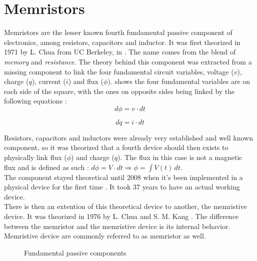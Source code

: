\section{Memristors}
\label{sec:memristors}

Memristors are the lesser known fourth fundamental passive component of electronics, among resistors, capacitors and inductor.
It was first theorized in 1971 by L. Chua from UC Berkeley, in \cite{TheoMemristor}. The name comes from the blend of \textit{memory} and \textit{resistance}.
The theory behind this component was extracted from a missing component to link the four fundamental circuit variables, voltage ($v$), charge ($q$), current ($i$) and flux ($\phi$).  shows the four fundamental variables are on each side of the square, with the ones on opposite sides being linked by the following equations :
\begin{equation}
  d\phi = v\cdot dt
\end{equation}

\begin{equation}
  dq = i\cdot dt
\end{equation}

Resistors, capacitors and inductors were already very established and well known component, so it was theorized that a fourth device should then exists to physically link flux ($\phi$) and charge ($q$).  The flux in this case is not a magnetic flux and is defined as such : $ d\phi=V\cdot dt \Rightarrow \phi =  \int V(t) \,dt  $.\\
The component stayed theoretical until 2008 when it's been implemented in a physical device for the first time \cite{memristorFab}. It took 37 years to have an actual working device.\\
There is then an extention of this theoretical device to another, the memristive device. It was theorized in 1976 by L. Chua and S. M. Kang \cite{memrestiveDev}. The difference between the memristor and the memristive device is its internal behavior. Memristive device are commonly referred to as memristor as well.

\begin{figure}[H]
  \centering
  
  \caption{Fundamental passive components}
  \label{fig:fundComp}
\end{figure}

